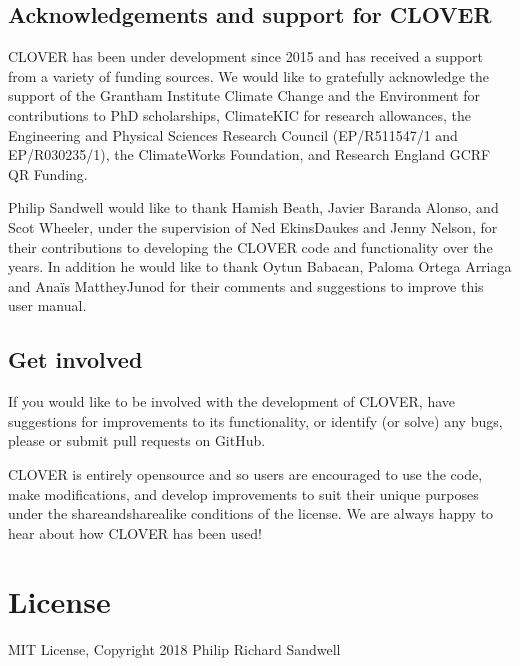 \documentclass[letterpaper,10pt,english]{sphinxmanual}
\begin{document}
\subsection{Acknowledgements and support for CLOVER}
\label{\detokenize{get_involved:acknowledgements-and-support-for-clover}}
\sphinxAtStartPar
CLOVER has been under development since 2015 and has received a support
from a variety of funding sources. We would like to gratefully
acknowledge the support of the Grantham Institute \sphinxhyphen{} Climate Change and
the Environment for contributions to PhD scholarships, Climate\sphinxhyphen{}KIC for
research allowances, the Engineering and Physical Sciences Research
Council (EP/R511547/1 and EP/R030235/1), the ClimateWorks Foundation,
and Research England GCRF QR Funding.

\sphinxAtStartPar
Philip Sandwell would like to thank Hamish Beath, Javier Baranda Alonso,
and Scot Wheeler, under the supervision of Ned Ekins\sphinxhyphen{}Daukes and Jenny
Nelson, for their contributions to developing the CLOVER code and
functionality over the years. In addition he would like to thank Oytun
Babacan, Paloma Ortega Arriaga and Anaïs Matthey\sphinxhyphen{}Junod for their
comments and suggestions to improve this user manual.


\subsection{Get involved}
\label{\detokenize{get_involved:get-involved}}
\sphinxAtStartPar
If you would like to be involved with the development of CLOVER, have
suggestions for improvements to its functionality, or identify (or
solve) any bugs, please  or submit pull requests on
GitHub.

\sphinxAtStartPar
CLOVER is entirely open\sphinxhyphen{}source and so users are encouraged to
use the code, make modifications, and develop improvements to suit their
unique purposes under the share\sphinxhyphen{}and\sphinxhyphen{}share\sphinxhyphen{}alike conditions of the
license. We are always happy to hear about how CLOVER has been used!


\section{License}
\label{\detokenize{license:license}}\label{\detokenize{license::doc}}
\sphinxAtStartPar
MIT License, Copyright 2018 Philip Richard Sandwell
\end{document}
